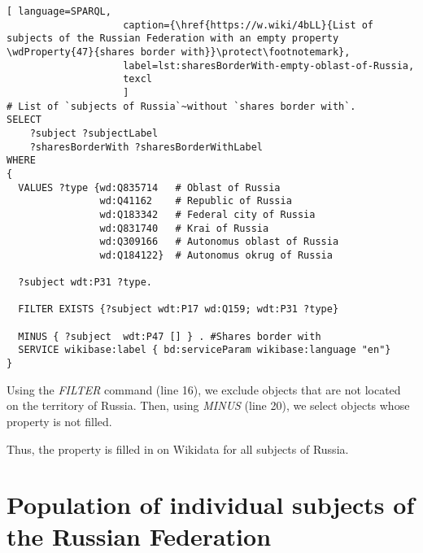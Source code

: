 \label{question:q_subjects_of_Russia_2}

\lstset{numbers=left, firstnumber=1, frame=single}
\begin{lstlisting}[ language=SPARQL, 
                    caption={\href{https://w.wiki/4bLL}{List of subjects of the Russian Federation with an empty property \wdProperty{47}{shares border with}}\protect\footnotemark},
                    label=lst:sharesBorderWith-empty-oblast-of-Russia,
                    texcl 
                    ]
# List of `subjects of Russia`~without `shares border with`. 
SELECT 
    ?subject ?subjectLabel 
    ?sharesBorderWith ?sharesBorderWithLabel
WHERE
{
  VALUES ?type {wd:Q835714   # Oblast of Russia
                wd:Q41162    # Republic of Russia
                wd:Q183342   # Federal city of Russia
                wd:Q831740   # Krai of Russia
                wd:Q309166   # Autonomus oblast of Russia
                wd:Q184122}  # Autonomus okrug of Russia
  
  ?subject wdt:P31 ?type.
  
  FILTER EXISTS {?subject wdt:P17 wd:Q159; wdt:P31 ?type}
  
  MINUS { ?subject  wdt:P47 [] } . #Shares border with 
  SERVICE wikibase:label { bd:serviceParam wikibase:language "en"}
}
\end{lstlisting}%

Using the \textit{FILTER} command (line 16), we exclude objects that are not located on the territory of Russia. Then, using \textit{MINUS} (line 20), we select objects whose property  is not filled.

Thus, the  property is filled in on Wikidata for all subjects of Russia.

\section{Population of individual subjects of the Russian Federation}

